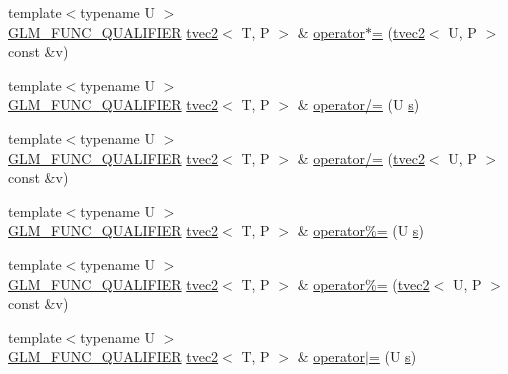 \begin{DoxyCompactItemize}
\item 
{\footnotesize template$<$typename U $>$ }\\\hyperlink{setup_8hpp_a33fdea6f91c5f834105f7415e2a64407}{G\+L\+M\+\_\+\+F\+U\+N\+C\+\_\+\+Q\+U\+A\+L\+I\+F\+I\+ER} \hyperlink{structglm_1_1detail_1_1tvec2}{tvec2}$<$ T, P $>$ \& \hyperlink{structglm_1_1detail_1_1tvec2_a74848e484fd662c04e7193575af09d97}{operator$\ast$=} (\hyperlink{structglm_1_1detail_1_1tvec2}{tvec2}$<$ U, P $>$ const \&v)
\item 
{\footnotesize template$<$typename U $>$ }\\\hyperlink{setup_8hpp_a33fdea6f91c5f834105f7415e2a64407}{G\+L\+M\+\_\+\+F\+U\+N\+C\+\_\+\+Q\+U\+A\+L\+I\+F\+I\+ER} \hyperlink{structglm_1_1detail_1_1tvec2}{tvec2}$<$ T, P $>$ \& \hyperlink{structglm_1_1detail_1_1tvec2_ab7aa78f8b11b296c3f69bd97ea1cf210}{operator/=} (U \hyperlink{structglm_1_1detail_1_1tvec2_a6d602cf7c31b75396944d828ad2aea72}{s})
\item 
{\footnotesize template$<$typename U $>$ }\\\hyperlink{setup_8hpp_a33fdea6f91c5f834105f7415e2a64407}{G\+L\+M\+\_\+\+F\+U\+N\+C\+\_\+\+Q\+U\+A\+L\+I\+F\+I\+ER} \hyperlink{structglm_1_1detail_1_1tvec2}{tvec2}$<$ T, P $>$ \& \hyperlink{structglm_1_1detail_1_1tvec2_a1825aedcd2a9a93e31e15f24fe690dbd}{operator/=} (\hyperlink{structglm_1_1detail_1_1tvec2}{tvec2}$<$ U, P $>$ const \&v)
\item 
{\footnotesize template$<$typename U $>$ }\\\hyperlink{setup_8hpp_a33fdea6f91c5f834105f7415e2a64407}{G\+L\+M\+\_\+\+F\+U\+N\+C\+\_\+\+Q\+U\+A\+L\+I\+F\+I\+ER} \hyperlink{structglm_1_1detail_1_1tvec2}{tvec2}$<$ T, P $>$ \& \hyperlink{structglm_1_1detail_1_1tvec2_a71fc811c1ce1628d6bfec02d4603d890}{operator\%=} (U \hyperlink{structglm_1_1detail_1_1tvec2_a6d602cf7c31b75396944d828ad2aea72}{s})
\item 
{\footnotesize template$<$typename U $>$ }\\\hyperlink{setup_8hpp_a33fdea6f91c5f834105f7415e2a64407}{G\+L\+M\+\_\+\+F\+U\+N\+C\+\_\+\+Q\+U\+A\+L\+I\+F\+I\+ER} \hyperlink{structglm_1_1detail_1_1tvec2}{tvec2}$<$ T, P $>$ \& \hyperlink{structglm_1_1detail_1_1tvec2_a80bb57e041c1b98953c54d896dae08dc}{operator\%=} (\hyperlink{structglm_1_1detail_1_1tvec2}{tvec2}$<$ U, P $>$ const \&v)
\item 
{\footnotesize template$<$typename U $>$ }\\\hyperlink{setup_8hpp_a33fdea6f91c5f834105f7415e2a64407}{G\+L\+M\+\_\+\+F\+U\+N\+C\+\_\+\+Q\+U\+A\+L\+I\+F\+I\+ER} \hyperlink{structglm_1_1detail_1_1tvec2}{tvec2}$<$ T, P $>$ \& \hyperlink{structglm_1_1detail_1_1tvec2_aaeea420df82cbb94b83d702248f1071d}{operator$\vert$=} (U \hyperlink{structglm_1_1detail_1_1tvec2_a6d602cf7c31b75396944d828ad2aea72}{s})

\end{DoxyCompactItemize}
